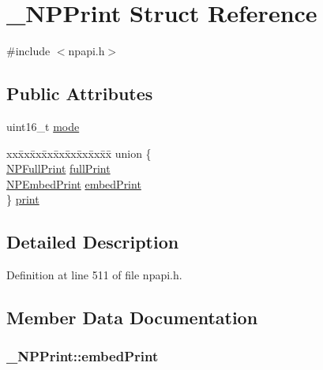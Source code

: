 \hypertarget{struct___n_p_print}{
\section{\_\-NPPrint Struct Reference}
\label{struct___n_p_print}
}


{\ttfamily \#include $<$npapi.h$>$}

\subsection*{Public Attributes}
\begin{DoxyCompactItemize}
\item 
uint16\_\-t \hyperlink{struct___n_p_print_ab35f85800a5a202edecad010baaf7a54}{mode}
\item 
\begin{tabbing}
xx\=xx\=xx\=xx\=xx\=xx\=xx\=xx\=xx\=\kill
union \{\\
\>\hyperlink{struct___n_p_full_print}{NPFullPrint} \hyperlink{struct___n_p_print_a115d1a36b9d19039a25689290949f654}{fullPrint}\\
\>\hyperlink{struct___n_p_embed_print}{NPEmbedPrint} \hyperlink{struct___n_p_print_afe1ab85defd77b5d27c30a1143205ab7}{embedPrint}\\
\} \hyperlink{struct___n_p_print_a3b01da2a510ff500419839fd0dcbe51a}{print}\\

\end{tabbing}\end{DoxyCompactItemize}


\subsection{Detailed Description}


Definition at line 511 of file npapi.h.



\subsection{Member Data Documentation}
\hypertarget{struct___n_p_print_afe1ab85defd77b5d27c30a1143205ab7}{
\subsubsection[{embedPrint}]{ {\bf \_\-NPPrint::embedPrint}}}
\label{struct___n_p_print_afe1ab85defd77b5d27c30a1143205ab7}


